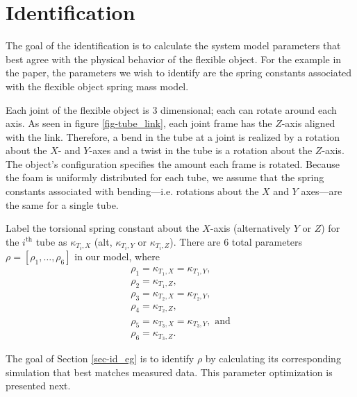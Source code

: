 \documentclass[runningheads,a4paper]{llncs}
\begin{document}
\section{Identification}
\label{sec-id}
The goal of the identification is to calculate the system model parameters that best agree with the physical behavior of the flexible object. For the example in the paper, the parameters we wish to identify are the spring constants associated with the flexible object spring mass model. 

Each joint of the flexible object is 3 dimensional; each can rotate around each axis. As seen in figure \ref{fig-tube_link}, each joint frame has the $Z$-axis aligned with the link. Therefore, a bend in the tube at a joint is realized by a rotation about the $X$- and $Y$-axes and a twist in the tube is a rotation about the $Z$-axis. The object's configuration specifies the amount each frame is rotated. Because the foam is uniformly distributed for each tube, we assume that the spring constants associated with bending---i.e. rotations about the $X$ and $Y$ axes---are the same for a single tube. 


Label the torsional spring constant about the $X$-axis (alternatively $Y$ or $Z$) for the $i^{\textrm{th}}$ tube as $\kappa_{T_i,X}$ (alt, $\kappa_{T_i,Y}$ or $\kappa_{T_i,Z}$). There are 6 total parameters $\rho = [\rho_1,\ldots,\rho_6]$ in our model, where 
\begin{equation}
\begin{array}{l}
\rho_1 = \kappa_{T_1,X} = \kappa_{T_1,Y}, \\
\rho_2 = \kappa_{T_1,Z}, \\
\rho_3 = \kappa_{T_2,X} = \kappa_{T_2,Y}, \\
\rho_4 = \kappa_{T_2,Z} , \\
\rho_5 = \kappa_{T_3,X} = \kappa_{T_3,Y}, \textrm{ and} \\
\rho_6 = \kappa_{T_3,Z}. 
\end{array}
\label{eq-params}
\end{equation}

The goal of Section \ref{sec-id_eg} is to identify $\rho$ by calculating its corresponding simulation that best matches measured data.  This parameter optimization is presented next.%
\end{document}
